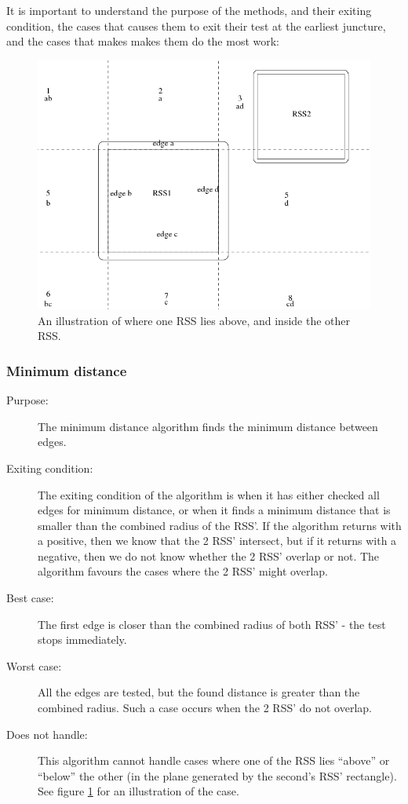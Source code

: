 It is important to understand the purpose of the methods, and their exiting condition, the cases that causes them to exit their test at the earliest juncture, and the cases that makes makes them do the most work:

\begin{figure}
\centering
\includegraphics[width=\textwidth]{figures/vorCheap}
\caption{\label{parallel} An illustration of where one RSS lies above, and inside the other RSS.}
\end{figure}

\subsubsection{Minimum distance}
\begin{description}
\item[Purpose:] The minimum distance algorithm finds the minimum distance between edges.
\item[Exiting condition:]The exiting condition of the algorithm is when it has either checked all edges for minimum distance, or when it finds a minimum distance that is smaller than the combined radius of the RSS'. If the algorithm returns with a positive, then we know that the 2 RSS' intersect, but if it returns with a negative, then we do not know whether the 2 RSS' overlap or not. The algorithm favours the cases where the 2 RSS' might overlap.
\item[Best case:] The first edge is closer than the combined radius of both RSS' - the test stops immediately.
\item[Worst case:] All the edges are tested, but the found distance is greater than the combined radius. Such a case occurs when the 2 RSS' do not overlap.
\item[Does not handle:] This algorithm cannot handle cases where one of the RSS lies ``above'' or ``below'' the other (in the plane generated by the second's RSS' rectangle). See figure \ref{parallel} for an illustration of the case.
\end{description}

